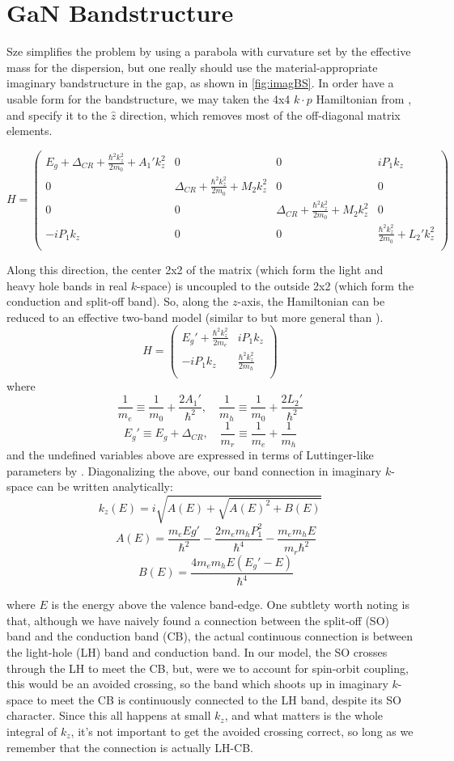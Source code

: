 \section{GaN Bandstructure}
Sze simplifies the problem by using a parabola with curvature set by the effective mass for the dispersion, but one really should use the material-appropriate imaginary bandstructure in the gap, as shown in \ref{fig:imagBS}.  In order have a usable form for the bandstructure, we may taken the 4x4 $k\cdot p$ Hamiltonian from \cite{Rinke_2008}, and specify it to the $\hat{z}$ direction, which removes most of the off-diagonal matrix elements.
\begin{widetext}
\[
  H=\begin{pmatrix}
    E_g+\Delta_{CR}+\frac{\hbar^2k_z^2}{2m_0}+A_1'k_z^2 & 0 & 0 &iP_1k_z\\
    0 &  \Delta_{CR}+\frac{\hbar^2k_z^2}{2m_0}+M_2k_z^2 & 0 & 0 \\
    0 & 0 & \Delta_{CR}+\frac{\hbar^2k_z^2}{2m_0}+M_2k_z^2 & 0 \\
    -iP_1k_z & 0 & 0 & \frac{\hbar^2k_z^2}{2m_0}+L_2'k_z^2  \\
  \end{pmatrix}
\]
\end{widetext}
Along this direction, the center 2x2 of the matrix (which form the light and heavy hole bands in real $k$-space) is uncoupled to the outside 2x2 (which form the conduction and split-off band).  So, along the $z$-axis, the Hamiltonian can be reduced to an effective two-band model (similar to but more general than \cite{Kane_1960}).
\[
  H=\begin{pmatrix}
    E_g'+\frac{\hbar^2k_z^2}{2m_e} & iP_1k_z\\
    -iP_1k_z & \frac{\hbar^2k_z^2}{2m_h} \\
  \end{pmatrix}
\]
where
\[\frac{1}{m_e}\equiv\frac{1}{m_0}+\frac{2A_1'}{\hbar^2},
\quad \frac{1}{m_h}\equiv\frac{1}{m_0}+\frac{2L_2'}{\hbar^2}
\]
\[
  E_g'\equiv E_g+\Delta_{CR}, \quad
\frac{1}{m_r}\equiv\frac{1}{m_e}+\frac{1}{m_h}
\]
and the undefined variables above are expressed in terms of Luttinger-like parameters by \cite{Rinke_2008}.  Diagonalizing the above, our band connection in imaginary $k$-space can be written analytically:
$$k_z(E)=i\sqrt{A(E)+\sqrt{A(E)^2+B(E)}}$$
$$\quad A(E)=\frac{m_eEg'}{\hbar^2}-\frac{2m_em_hP_1^2}{\hbar^4}-\frac{m_em_hE}{m_r\hbar^2}$$
$$\quad B(E)=\frac{4m_em_hE(E_g'-E)}{\hbar^4}$$

where $E$ is the energy above the valence band-edge.  One subtlety worth noting is that, although we have naively found a connection between the split-off (SO) band and the conduction band (CB), the actual continuous connection is between the light-hole (LH) band and conduction band.  In our model, the SO crosses through the LH to meet the CB, but, were we to account for spin-orbit coupling, this would be an avoided crossing, so the band which shoots up in imaginary $k$-space to meet the CB is continuously connected to the LH band, despite its SO character.  Since this all happens at small $k_z$, and what matters is the whole integral of $k_z$, it's not important to get the avoided crossing correct, so long as we remember that the connection is actually LH-CB.

